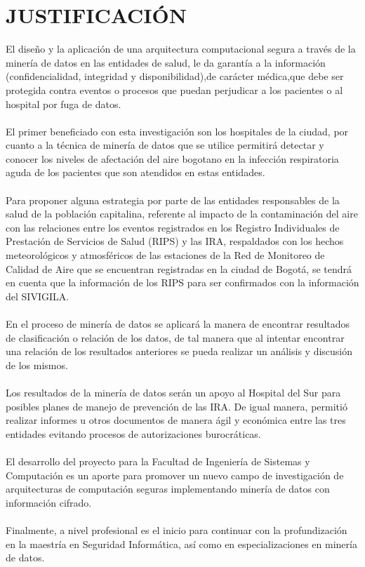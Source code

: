 \documentclass[a4paper,openright,12pt]{book}
\theoremstyle{definition}
\theoremstyle{remark}
\begin{document}
\section{JUSTIFICACIÓN}
El diseño y la aplicación de una arquitectura computacional segura a través de la minería de datos en las entidades de salud, le da garantía a la información (confidencialidad, integridad y disponibilidad),de carácter médica,que debe ser protegida contra eventos o procesos que puedan perjudicar a los pacientes o al hospital por fuga de datos.\\\\
El primer beneficiado con esta investigación son los hospitales de la ciudad, por cuanto a la técnica de minería de datos que se utilice permitirá detectar y conocer los niveles de afectación del aire bogotano en la infección respiratoria aguda de los pacientes que son atendidos en estas entidades.\\\\
Para proponer alguna estrategia por parte de las entidades responsables de la salud de la población capitalina, referente al impacto de la contaminación del aire con las relaciones entre los eventos registrados en los Registro Individuales  de Prestación de Servicios de Salud (RIPS) y las IRA, respaldados con los hechos meteorológicos y atmosféricos de las estaciones de la Red de Monitoreo de Calidad de Aire que se encuentran registradas en la ciudad de Bogotá, se tendrá en cuenta que la información de los RIPS para ser confirmados con la información del SIVIGILA.\\\\
En el proceso de minería de datos se aplicará la manera de encontrar resultados de clasificación o relación de los datos, de tal manera que al intentar encontrar una relación de los resultados anteriores se pueda realizar un análisis y discusión de los mismos.\\\\
Los resultados de la minería de datos serán un apoyo  al Hospital del Sur para posibles planes de manejo de prevención de las IRA. De igual manera, permitió realizar informes u otros documentos de manera ágil y económica entre las tres entidades evitando procesos de autorizaciones burocráticas.\\\\
El desarrollo del proyecto para la Facultad de Ingeniería de Sistemas y Computación es un aporte para promover un nuevo campo de investigación de arquitecturas de computación seguras implementando minería de datos con información cifrado.\\\\ Finalmente, a nivel profesional es el inicio para continuar con la profundización en la maestría en Seguridad Informática, así como en especializaciones en minería de datos.
\end{document}
